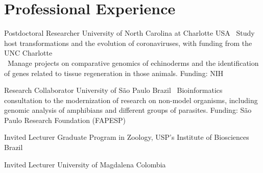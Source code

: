 
\section{Professional Experience}

    	{Postdoctoral Researcher}
    	{University of North Carolina at Charlotte}
    	{USA}
    	{}
    	{
    		\textbullet~Study host transformations and the evolution of coronaviruses, with funding from the UNC Charlotte\\
    		\textbullet~Manage projects on comparative genomics of echinoderms and the identification of genes related to tissue regeneration in those animals. Funding: NIH
    	}
    
    	{Research Collaborator}
    	{University of São Paulo}
    	{Brazil}
    	{}
    	{
    		\textbullet~Bioinformatics consultation to the modernization of research on non-model organisms, including genomic analysis of amphibians and different groups of parasites. Funding: São Paulo Research Foundation (FAPESP)
    	}
    
    	{Invited Lecturer}
    	{Graduate Program in Zoology, USP's Institute of Biosciences}
    	{Brazil}
    	{}
    	{}
    
    	{Invited Lecturer}
    	{University of Magdalena}
    	{Colombia}
    	{}
    	{}